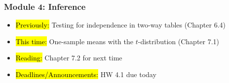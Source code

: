
\begin{frame}
    \frametitle{Module 4: Inference}
    \begin{itemize}
        \item \hl{Previously: }Testing for independence in two-way tables (Chapter 6.4)
        \item \hl{This time: }One-sample means with the $t$-distribution (Chapter 7.1)
        \item \hl{Reading: }Chapter 7.2 for next time
        \item \hl{Deadlines/Announcements: }HW 4.1 due today
    \end{itemize}
    
\end{frame}
